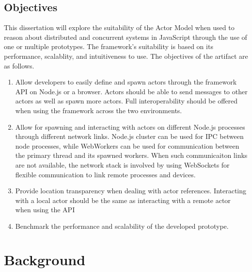 \documentclass[12pt, a4paper]{report}
\theoremstyle{definition}
\theoremstyle{definition}%
\theoremstyle{definition}%
\theoremstyle{definition}%
\theoremstyle{definition}%
\theoremstyle{definition}%
\begin{document}
\section{Objectives}
This dissertation will explore the suitability of the Actor Model when used to reason about distributed and concurrent systems in JavaScript through the use of one or multiple prototypes. The framework's suitability is based on its performance, scalablity, and intuitiveness to use. The objectives of the artifact are as follows.
\begin{enumerate}
    \item Allow developers to easily define and spawn actors through the framework API on Node.js or a browser. Actors should be able to send messages to other actors as well as spawn more actors. Full interoperability should be offered when using the framework across the two environments.
    \item Allow for spawning and interacting with actors on different Node.js processes through different network links. Node.js cluster\cite{cluster} can be used for IPC between node processes, while WebWorkers\cite{webworkers} can be used for communication between the primary thread and its spawned workers. When such communicaiton links are not available, the network stack is involved by using WebSockets for flexible communication to link remote processes and devices.
    \item Provide location transparency when dealing with actor references. Interacting with a local actor should be the same as interacting with a remote actor when using the API
    \item Benchmark the performance and scalability of the developed prototype.
\end{enumerate}

\chapter{Background}
\end{document}
